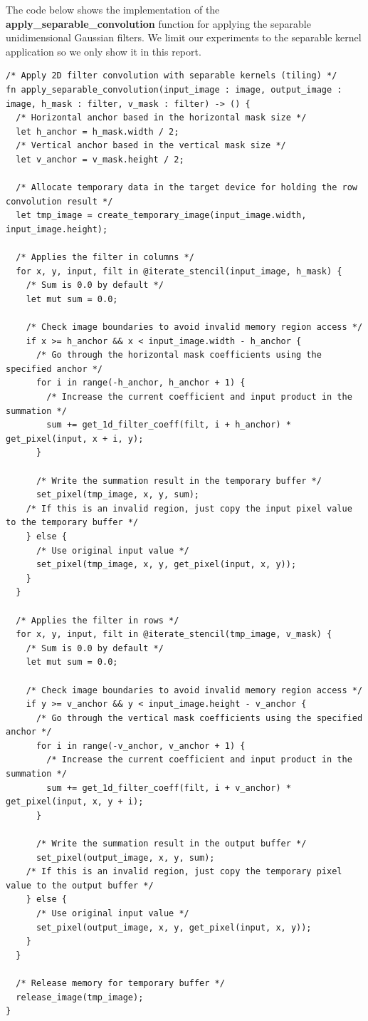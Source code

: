 \documentclass{article}
\begin{document}
\pagebreak

The code below shows the implementation of the \textbf{apply\_separable\_convolution} function for applying the separable unidimensional Gaussian filters. We limit our experiments to the separable kernel application so we only show it in this report.

\begin{verbatim}
/* Apply 2D filter convolution with separable kernels (tiling) */
fn apply_separable_convolution(input_image : image, output_image : image, h_mask : filter, v_mask : filter) -> () {
  /* Horizontal anchor based in the horizontal mask size */
  let h_anchor = h_mask.width / 2;
  /* Vertical anchor based in the vertical mask size */
  let v_anchor = v_mask.height / 2;

  /* Allocate temporary data in the target device for holding the row convolution result */
  let tmp_image = create_temporary_image(input_image.width, input_image.height);

  /* Applies the filter in columns */
  for x, y, input, filt in @iterate_stencil(input_image, h_mask) {
    /* Sum is 0.0 by default */
    let mut sum = 0.0;

    /* Check image boundaries to avoid invalid memory region access */
    if x >= h_anchor && x < input_image.width - h_anchor {
      /* Go through the horizontal mask coefficients using the specified anchor */
      for i in range(-h_anchor, h_anchor + 1) {
        /* Increase the current coefficient and input product in the summation */
        sum += get_1d_filter_coeff(filt, i + h_anchor) * get_pixel(input, x + i, y);
      }

      /* Write the summation result in the temporary buffer */
      set_pixel(tmp_image, x, y, sum);
    /* If this is an invalid region, just copy the input pixel value to the temporary buffer */
    } else {
      /* Use original input value */
      set_pixel(tmp_image, x, y, get_pixel(input, x, y));
    }
  }

  /* Applies the filter in rows */
  for x, y, input, filt in @iterate_stencil(tmp_image, v_mask) {
    /* Sum is 0.0 by default */
    let mut sum = 0.0;

    /* Check image boundaries to avoid invalid memory region access */
    if y >= v_anchor && y < input_image.height - v_anchor {
      /* Go through the vertical mask coefficients using the specified anchor */
      for i in range(-v_anchor, v_anchor + 1) {
        /* Increase the current coefficient and input product in the summation */
        sum += get_1d_filter_coeff(filt, i + v_anchor) * get_pixel(input, x, y + i);
      }

      /* Write the summation result in the output buffer */
      set_pixel(output_image, x, y, sum);
    /* If this is an invalid region, just copy the temporary pixel value to the output buffer */
    } else {
      /* Use original input value */
      set_pixel(output_image, x, y, get_pixel(input, x, y));
    }
  }

  /* Release memory for temporary buffer */
  release_image(tmp_image);
}
\end{verbatim}
\end{document}
